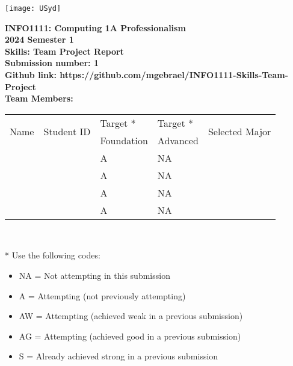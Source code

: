 \documentclass[a4paper, 11pt]{report}
\begin{document}
\begin{titlepage}
\begin{flushright}
\texttt{[image: USyd]}\\[1cm]
\end{flushright}

\begin{centering}
\textbf{\huge INFO1111: Computing 1A Professionalism}\\[0.75cm]
\textbf{\huge 2024 Semester 1}\\[2cm]
\textbf{\huge Skills: Team Project Report}\\[2cm]

\textbf{\large Submission number: 1}\\[0.5cm]
\textbf{\large Github link: https://github.com/mgebrael/INFO1111-Skills-Team-Project}\\[0.75cm]
\textbf{\huge Team Members:}\\[0.75cm]

\begin{tabular}{|p{}|p{}|p{}|p{}|p{}|}
	\hline
	\multirow{2}{*}{Name} & \multirow{2}{*}{Student ID} & Target * & Target * & \multirow{2}{*}{Selected Major} \\
	 & & Foundation & Advanced & \\
	\hline
	\hline
	\raggedright{\studA} & \sidA & A & NA & \majA \\
	\hline
	\raggedright{\studB} & \sidB & A & NA & \majB \\
	\hline
	\raggedright{\studC} & \sidC & A & NA & \majC \\
	\hline
	\raggedright{\studD} & \sidD & A & NA & \majD \\
	\hline
\end{tabular}
\\[0.5cm]
\end{centering}

* Use the following codes:
\begin{itemize}
\setlength\itemsep{0em}
\item NA = Not attempting in this submission
\item A = Attempting (not previously attempting)
\item AW = Attempting (achieved weak in a previous submission) 
\item AG = Attempting (achieved good in a previous submission)
\item S = Already achieved strong in a previous submission
\end{itemize}

\thispagestyle{empty}
\end{titlepage}
\end{document}
